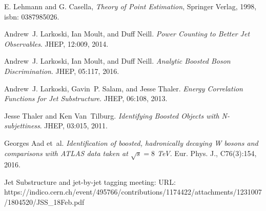 \documentclass[UKenglish,texlive=2013]{\ATLASLATEXPATH atlasdoc}
\begin{document}
\begin{thebibliography}{9}

E. Lehmann and G. Casella,
\emph{Theory of Point Estimation},
Springer Verlag, 1998,
isbn: 0387985026.


Andrew~J. Larkoski, Ian Moult, and Duff Neill.
\emph {Power Counting to Better Jet Observables}.
 JHEP, 12:009, 2014.

Andrew~J. Larkoski, Ian Moult, and Duff Neill.
\emph {Analytic Boosted Boson Discrimination}.
 JHEP, 05:117, 2016.

Andrew~J. Larkoski, Gavin~P. Salam, and Jesse Thaler.
\emph {Energy Correlation Functions for Jet Substructure}.
 JHEP, 06:108, 2013.

Jesse Thaler and Ken Van~Tilburg.
\emph {Identifying Boosted Objects with N-subjettiness}.
 JHEP, 03:015, 2011.


Georges Aad et~al.
\emph {Identification of boosted, hadronically decaying W bosons and
  comparisons with ATLAS data taken at $\sqrt{s} = 8$ TeV}.
 Eur. Phys. J., C76(3):154, 2016.

Jet Substructure and jet-by-jet tagging meeting:
URL: https://indico.cern.ch/event/495766/contributions/1174422/attachments/1231007/1804520/JSS\_18Feb.pdf

\end{thebibliography}
\printbibliography
%
%


\clearpage
\appendix
\end{document}
